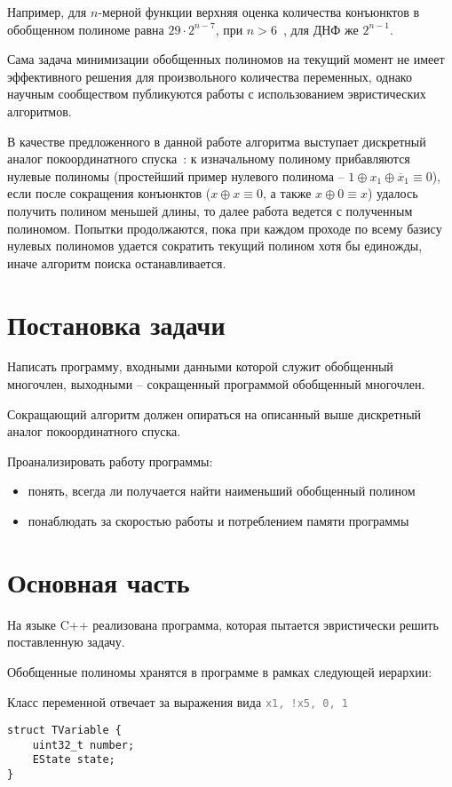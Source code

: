 \documentclass[a4paper,12pt,titlepage,finall]{article}
\newcommand{\code}[1]{\textcolor{gray}{\texttt{#1}}}
\begin{document}
Например, для $n$-мерной функции верхняя оценка количества конъюнктов в обобщенном полиноме равна $29 \cdot 2^{n - 7}$, при $n > 6$~\cite{bound}, для ДНФ же $2^{n - 1}$.

Сама задача минимизации обобщенных полиномов на текущий момент не имеет эффективного решения для произвольного количества переменных, однако научным сообществом публикуются работы с использованием эвристических алгоритмов.

В качестве предложенного в данной работе алгоритма выступает дискретный аналог покоординатного спуска~\cite{metopt}: к изначальному полиному прибавляются нулевые полиномы (простейший пример нулевого полинома -- $1 \oplus x_1 \oplus \overline x_1 \equiv 0$), если после сокращения конъюнктов ($x \oplus x \equiv 0$, а также $x \oplus 0 \equiv x$) удалось получить полином меньшей длины, то далее работа ведется с полученным полиномом.
Попытки продолжаются, пока при каждом проходе по всему базису нулевых полиномов удается сократить текущий полином хотя бы единожды, иначе алгоритм поиска останавливается.

\section{Постановка задачи}

Написать программу, входными данными которой служит обобщенный многочлен, выходными -- сокращенный программой обобщенный многочлен.

Сокращающий алгоритм должен опираться на описанный выше дискретный аналог покоординатного спуска.

Проанализировать работу программы:
\begin{itemize}
    \item понять, всегда ли получается найти наименьший обобщенный полином
    \item понаблюдать за скоростью работы и потреблением памяти программы
\end{itemize}

\section{Основная часть}

На языке C++ реализована программа, которая пытается эвристически решить поставленную задачу.

Обобщенные полиномы хранятся в программе в рамках следующей иерархии:

Класс переменной отвечает за выражения вида \code{x1, !x5, 0, 1}
\begin{lstlisting}
struct TVariable {
    uint32_t number;
    EState state;
}
\end{lstlisting}
\end{document}
